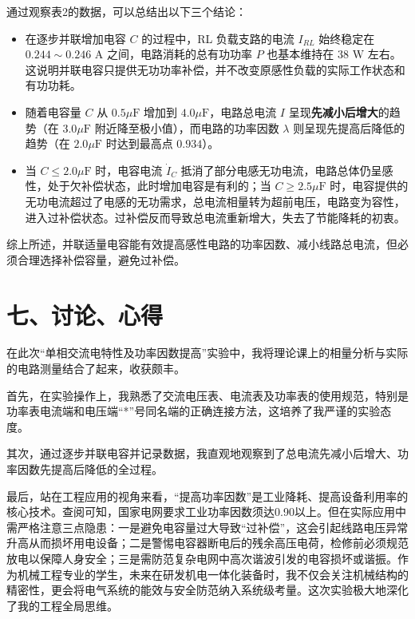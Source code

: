 \documentclass[10.5pt]{config}
\begin{document}
通过观察表2的数据，可以总结出以下三个结论：
\begin{itemize}[leftmargin=2em]
    \item 在逐步并联增加电容 $C$ 的过程中，RL 负载支路的电流 $I_{RL}$ 始终稳定在 $0.244 \sim 0.246\text{ A}$ 之间，电路消耗的总有功功率 $P$ 也基本维持在 $38\text{ W}$ 左右。这说明并联电容只提供无功功率补偿，并不改变原感性负载的实际工作状态和有功功耗。
    \item 随着电容量 $C$ 从 $0.5\mu\mathrm{F}$ 增加到 $4.0\mu\mathrm{F}$，电路总电流 $I$ 呈现\textbf{先减小后增大}的趋势（在 $3.0\mu\mathrm{F}$ 附近降至极小值），而电路的功率因数 $\lambda$ 则呈现先提高后降低的趋势（在 $2.0\mu\mathrm{F}$ 时达到最高点 $0.934$）。
    \item 当 $C \le 2.0\mu\mathrm{F}$ 时，电容电流 $\dot{I}_C$ 抵消了部分电感无功电流，电路总体仍呈感性，处于欠补偿状态，此时增加电容是有利的；当 $C \ge 2.5\mu\mathrm{F}$ 时，电容提供的无功电流超过了电感的无功需求，总电流相量转为超前电压，电路变为容性，进入过补偿状态。过补偿反而导致总电流重新增大，失去了节能降耗的初衷。
\end{itemize}
综上所述，并联适量电容能有效提高感性电路的功率因数、减小线路总电流，但必须合理选择补偿容量，避免过补偿。

\section*{七、讨论、心得}

在此次“单相交流电特性及功率因数提高”实验中，我将理论课上的相量分析与实际的电路测量结合了起来，收获颇丰。

首先，在实验操作上，我熟悉了交流电压表、电流表及功率表的使用规范，特别是功率表电流端和电压端“*”号同名端的正确连接方法，这培养了我严谨的实验态度。

其次，通过逐步并联电容并记录数据，我直观地观察到了总电流先减小后增大、功率因数先提高后降低的全过程。

最后，站在工程应用的视角来看，“提高功率因数”是工业降耗、提高设备利用率的核心技术。查阅可知，国家电网要求工业功率因数须达0.90以上。但在实际应用中需严格注意三点隐患：一是避免电容量过大导致“过补偿”，这会引起线路电压异常升高从而损坏用电设备；二是警惕电容器断电后的残余高压电荷，检修前必须规范放电以保障人身安全；三是需防范复杂电网中高次谐波引发的电容损坏或谐振。作为机械工程专业的学生，未来在研发机电一体化装备时，我不仅会关注机械结构的精密性，更会将电气系统的能效与安全防范纳入系统级考量。这次实验极大地深化了我的工程全局思维。
\end{document}
